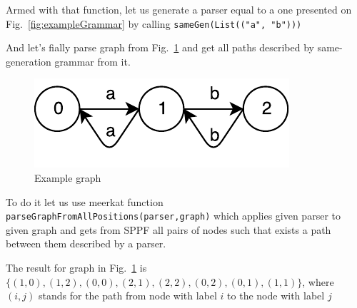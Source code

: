 Armed with that function, let us generate a parser equal to a one presented on Fig.~\ref{fig:exampleGrammar} by calling \lstinline{sameGen(List(("a", "b")))}

And let's fially parse graph from Fig.~\ref{fig:graph} and get all paths described by same-generation grammar from it.

\begin{figure}[h]
\includegraphics{graph}
\caption{Example graph}
\label{fig:graph}
\end{figure}

To do it let us use meerkat function \lstinline{parseGraphFromAllPositions(parser,graph)} which applies given parser to given graph and gets from SPPF all pairs of nodes such that exists a path between them described by a parser.

The result for graph in Fig.~\ref{fig:graph} is $\{(1,0), (1,2), (0,0), (2,1), (2,2), (0,2), (0,1), (1,1)\}$, where $(i,j)$ stands for the path from node with label $i$ to the node with label $j$


